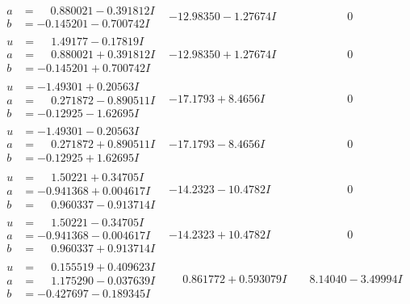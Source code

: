 \documentclass[1p]{elsarticle_modified}
\theoremstyle{definition}
\begin{document}
$$\begin{array}{c|c|c}
\begin{aligned}
a &= \phantom{-}0.880021 - 0.391812 I \\
b &= -0.145201 - 0.700742 I\end{aligned}
 & -12.98350 - 1.27674 I & \phantom{-0.000000 } 0 \\ \hline\begin{aligned}
u &= \phantom{-}1.49177 - 0.17819 I \\
a &= \phantom{-}0.880021 + 0.391812 I \\
b &= -0.145201 + 0.700742 I\end{aligned}
 & -12.98350 + 1.27674 I & \phantom{-0.000000 } 0 \\ \hline\begin{aligned}
u &= -1.49301 + 0.20563 I \\
a &= \phantom{-}0.271872 - 0.890511 I \\
b &= -0.12925 - 1.62695 I\end{aligned}
 & -17.1793 + 8.4656 I & \phantom{-0.000000 } 0 \\ \hline\begin{aligned}
u &= -1.49301 - 0.20563 I \\
a &= \phantom{-}0.271872 + 0.890511 I \\
b &= -0.12925 + 1.62695 I\end{aligned}
 & -17.1793 - 8.4656 I & \phantom{-0.000000 } 0 \\ \hline\begin{aligned}
u &= \phantom{-}1.50221 + 0.34705 I \\
a &= -0.941368 + 0.004617 I \\
b &= \phantom{-}0.960337 - 0.913714 I\end{aligned}
 & -14.2323 - 10.4782 I & \phantom{-0.000000 } 0 \\ \hline\begin{aligned}
u &= \phantom{-}1.50221 - 0.34705 I \\
a &= -0.941368 - 0.004617 I \\
b &= \phantom{-}0.960337 + 0.913714 I\end{aligned}
 & -14.2323 + 10.4782 I & \phantom{-0.000000 } 0 \\ \hline\begin{aligned}
u &= \phantom{-}0.155519 + 0.409623 I \\
a &= \phantom{-}1.175290 - 0.037639 I \\
b &= -0.427697 - 0.189345 I\end{aligned}
 & \phantom{-}0.861772 + 0.593079 I & \phantom{-}8.14040 - 3.49994 I \\ \hline\begin{aligned}

\end{aligned}
\end{array}$$
\end{document}
